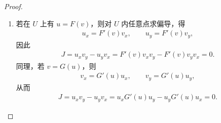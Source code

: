 \documentclass[../../main.tex]{subfiles}%
\begin{document}
\begin{proof}
\begin{enumerate}[(1)]
若 \(\nabla v(P_0)=0\) 但 \(\nabla u(P_0)\ne0\)，则类似地，不妨设 \(u_y(P_0)\ne0\)。由\hyperref[theorem:隐函数可微性定理]{隐函数可微性定理}得 \(y=\phi(x,u)\)，令
\begin{align*}
\Psi(x,u)=g(x,\phi(x,u)),
\end{align*}
则在 \(U\) 上 \(v=\Psi(x,u)\)。同样利用 \(J=0\)，有
\begin{align*}
0=J=
\begin{vmatrix}
u_x & u_y\\
v_x & v_y
\end{vmatrix}
=
\begin{vmatrix}
u_x & u_y\\
\Psi_x+\Psi_u u_x & \Psi_u u_y
\end{vmatrix}
= u_x\Psi_u u_y - u_y(\Psi_x+\Psi_u u_x) = -u_y\Psi_x,
\end{align*}
因 \(u_y\ne0\)，得 \(\Psi_x=0\)，故 \(\Psi\) 与 \(x\) 无关，即存在一元连续可微函数 \(G\) 使 \(v=\Psi(u)=G(u)\)。
\item 若在 \(U\) 上有 \(u=F(v)\)，则对 \(U\) 内任意点求偏导，得
\begin{align*}
u_x=F'(v)v_x,\qquad u_y=F'(v)v_y,
\end{align*}
因此
\begin{align*}
J=u_xv_y-u_yv_x=F'(v)v_xv_y-F'(v)v_yv_x=0.
\end{align*}
同理，若 \(v=G(u)\)，则
\begin{align*}
v_x=G'(u)u_x,\qquad v_y=G'(u)u_y,
\end{align*}
从而
\begin{align*}
J=u_xv_y-u_yv_x=u_xG'(u)u_y-u_yG'(u)u_x=0.
\end{align*}
\end{enumerate}
\end{proof}
\end{document}
